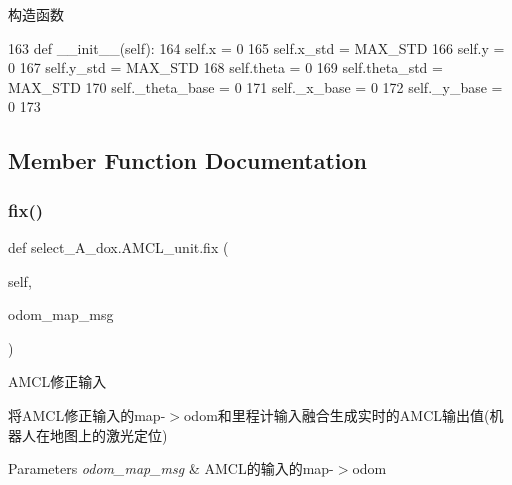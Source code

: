 构造函数 


\begin{DoxyCode}
163     \textcolor{keyword}{def }\_\_init\_\_(self):
164         self.x = 0
165         self.x\_std = MAX\_STD
166         self.y = 0
167         self.y\_std = MAX\_STD
168         self.theta = 0
169         self.theta\_std = MAX\_STD
170         self.\_theta\_base = 0
171         self.\_x\_base = 0
172         self.\_y\_base = 0
173 
\end{DoxyCode}


\subsection{Member Function Documentation}
\mbox{\label{classselect___a__dox_1_1_a_m_c_l__unit_a1f6f020f331d34d9b98d93c29597906c}} 
\subsubsection{\texorpdfstring{fix()}{fix()}}
{\footnotesize\ttfamily def select\+\_\+\+A\+\_\+dox.\+A\+M\+C\+L\+\_\+unit.\+fix (\begin{DoxyParamCaption}\item[{}]{self,  }\item[{}]{odom\+\_\+map\+\_\+msg }\end{DoxyParamCaption})}



A\+M\+C\+L修正输入 

将\+A\+M\+C\+L修正输入的map-\/$>$odom和里程计输入融合生成实时的\+A\+M\+C\+L输出值(机器人在地图上的激光定位)


\begin{DoxyParams}{Parameters}
{\em odom\+\_\+map\+\_\+msg} & A\+M\+C\+L的输入的map-\/$>$odom \\
\hline
\end{DoxyParams}

